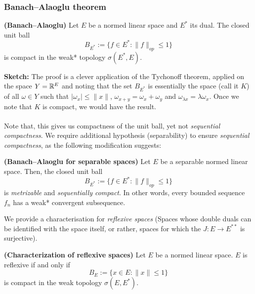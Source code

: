 \subsubsection{Banach--Alaoglu theorem}
\begin{theorem} \textbf{(Banach--Alaoglu)} Let $E$ be a normed linear space and $E^*$ its dual. The closed unit ball $$B_{E^*}:=\{f\in E^*: \| f\|_{op}\leq 1 \}$$
is compact in the weak* topology $\sigma(E^*,E)$.
\end{theorem}
\textbf{Sketch:} The proof is a clever application of the Tychonoff theorem, applied on the space $Y=\mathbb{R}^E$ and noting that the set $B_{E^*}$ is essentially the space (call it $K$) of all $\omega\in Y$ such that $|\omega_x|\leq \|x\|$, $\omega_{x+y}=\omega_x+\omega_y$ and $\omega_{\lambda x}=\lambda \omega_x$. Once we note that $K$ is compact, we would have the result.
\\\\ Note that, this gives us compactness of the unit ball, yet not \emph{sequential compactness}. We require additional hypothesis (separability) to ensure \emph{sequential compactness}, as the following modification suggests: 
\begin{theorem}
    \textbf{(Banach--Alaoglu for separable spaces)} Let $E$ be a separable normed linear space. Then, the closed unit ball $$B_{E^*}:=\{f\in E^*: \|f\|_{op}\leq 1\}$$ is \emph{metrizable} and \emph{sequentially compact}. In other words, every bounded sequence $f_n$ has a weak* convergent subsequence.
\end{theorem}

We provide a characterisation for \emph{reflexive spaces} (Spaces whose double duals can be identified with the space itself, or rather, spaces for which the $J:E\to E^{**}$ is surjective).
\begin{theorem}
    \textbf{(Characterization of reflexive spaces)} Let $E$ be a normed linear space. $E$ is reflexive if and only if $$B_E:=\{x\in E:\|x\|\leq 1\} $$ is compact in the weak topology $\sigma(E,E^*)$. 
\end{theorem}

